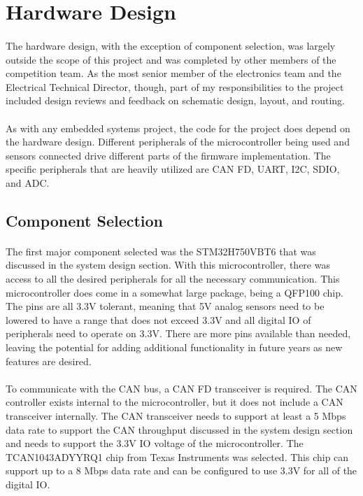 \section{Hardware Design}

\paragraph{}
The hardware design, with the exception of component selection, was largely outside the scope of this project and was completed by other members of the competition team.
As the most senior member of the electronics team and the Electrical Technical Director, though, part of my responsibilities to the project included design reviews and feedback on schematic design, layout, and routing.

\paragraph{}
As with any embedded systems project, the code for the project does depend on the hardware design.
Different peripherals of the microcontroller being used and sensors connected drive different parts of the firmware implementation.
The specific peripherals that are heavily utilized are CAN FD, UART, I2C, SDIO, and ADC.

\subsection{Component Selection}

\paragraph{}
The first major component selected was the STM32H750VBT6 that was discussed in the system design section.
With this microcontroller, there was access to all the desired peripherals for all the necessary communication.
This microcontroller does come in a somewhat large package, being a QFP100 chip.
The pins are all 3.3V tolerant, meaning that 5V analog sensors need to be lowered to have a range that does not exceed 3.3V and all digital IO of peripherals need to operate on 3.3V.
There are more pins available than needed, leaving the potential for adding additional functionality in future years as new features are desired.

\paragraph{}
To communicate with the CAN bus, a CAN FD transceiver is required.
The CAN controller exists internal to the microcontroller, but it does not include a CAN transceiver internally.
The CAN transceiver needs to support at least a 5 Mbps data rate to support the CAN throughput discussed in the system design section and needs to support the 3.3V IO voltage of the microcontroller.
The TCAN1043ADYYRQ1 chip from Texas Instruments \cite{CANProductPage} was selected.
This chip can support up to a 8 Mbps data rate and can be configured to use 3.3V for all of the digital IO.

